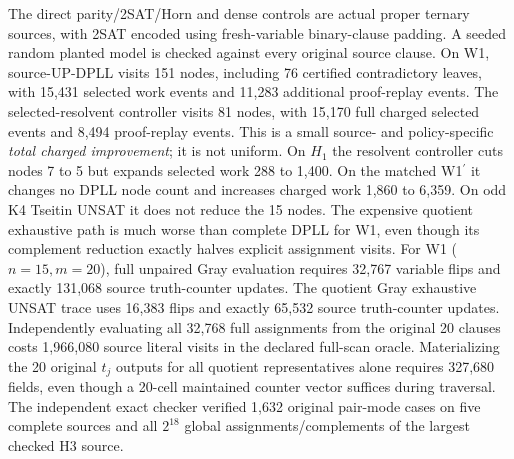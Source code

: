 \documentclass[10pt]{article}
\begin{document}
The direct parity/2SAT/Horn and dense controls are actual proper ternary sources, with 2SAT encoded using fresh-variable binary-clause padding. A seeded random planted model is checked against every original source clause. On W1, source-UP-DPLL visits 151 nodes, including 76 certified contradictory leaves, with 15,431 selected work events and 11,283 additional proof-replay events. The selected-resolvent controller visits 81 nodes, with 15,170 full charged selected events and 8,494 proof-replay events. This is a small source- and policy-specific \emph{total charged improvement}; it is not uniform. On $H_1$ the resolvent controller cuts nodes 7 to 5 but expands selected work 288 to 1,400. On the matched W1$^\prime$ it changes no DPLL node count and increases charged work 1,860 to 6,359. On odd K4 Tseitin UNSAT it does not reduce the 15 nodes. The expensive quotient exhaustive path is much worse than complete DPLL for W1, even though its complement reduction exactly halves explicit assignment visits.
For W1 ($n=15,m=20$), full unpaired Gray evaluation requires 32,767 variable flips and exactly 131,068 source truth-counter updates. The quotient Gray exhaustive UNSAT trace uses 16,383 flips and exactly 65,532 source truth-counter updates. Independently evaluating all 32,768 full assignments from the original 20 clauses costs 1,966,080 source literal visits in the declared full-scan oracle. Materializing the 20 original $t_j$ outputs for all quotient representatives alone requires 327,680 fields, even though a 20-cell maintained counter vector suffices during traversal. The independent exact checker verified 1,632 original pair-mode cases on five complete sources and all $2^{18}$ global assignments/complements of the largest checked H3 source.
\end{document}
